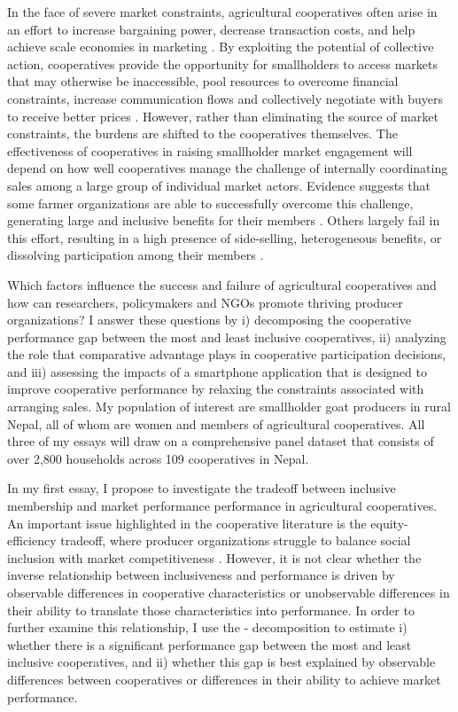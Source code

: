 \documentclass[11pt]{article}
\begin{document}
In the face of severe market constraints, agricultural cooperatives often arise in an effort to increase bargaining power, decrease transaction costs, and help achieve scale economies in marketing \citep{markelova-et.al.09,rondot-collion01,staal-et.al.97,worldbank03}. By exploiting the potential of collective action, cooperatives provide the opportunity for smallholders to access markets that may otherwise be inaccessible, pool resources to overcome financial constraints, increase communication flows and collectively negotiate with buyers to receive better prices \citep{poole-defrece10}. However, rather than eliminating the source of market constraints, the burdens are shifted to the cooperatives themselves. The effectiveness of cooperatives in raising smallholder market engagement will depend on how well cooperatives manage the challenge of internally coordinating sales among a large group of individual market actors. Evidence suggests that some farmer organizations are able to successfully overcome this challenge, generating large and inclusive benefits for their members \citep{narrod-et.al.09,tadesse-bahiigwa15,wollni-zeller07}. Others largely fail in this effort, resulting in a high presence of side-selling, heterogeneous benefits, or dissolving participation among their members \citep{aflagah-et.al.19,bernard-spielman09, casaburi-macchiavello15}. 

Which factors influence the success and failure of agricultural cooperatives and how can researchers, policymakers and NGOs promote thriving producer organizations? I answer these questions by i) decomposing the cooperative performance gap between the most and least inclusive cooperatives, ii) analyzing the role that comparative advantage plays in cooperative participation decisions, and iii) assessing the impacts of a smartphone application that is designed to improve cooperative performance by relaxing the constraints associated with arranging sales. My population of interest are smallholder goat producers in rural Nepal, all of whom are women and members of agricultural cooperatives. All three of my essays will draw on a comprehensive panel dataset that consists of over 2,800 households across 109 cooperatives in Nepal.

In my first essay, I propose to investigate the tradeoff between inclusive membership and market performance performance in agricultural cooperatives. An important issue highlighted in the cooperative literature is the equity-efficiency tradeoff, where producer organizations struggle to balance social inclusion with market competitiveness \citep{bernard-spielman09,worldbank08}. However, it is not clear whether the inverse relationship between inclusiveness and performance is driven by observable differences in cooperative characteristics or unobservable differences in their ability to translate those characteristics into performance. In order to further examine this relationship, I use the \citet{oaxaca73}-\citet{blinder73} decomposition to estimate i) whether there is a significant performance gap between the most and least inclusive cooperatives, and ii) whether this gap is best explained by observable differences between cooperatives or differences in their ability to achieve market performance. 
\end{document}
